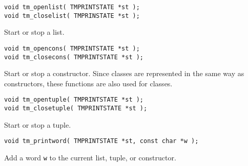 \begin{verbatim}
void tm_openlist( TMPRINTSTATE *st );
void tm_closelist( TMPRINSTATE *st );
\end{verbatim}
\begin{desc}
Start or stop a list.
\end{desc}
\begin{verbatim}
void tm_opencons( TMPRINTSTATE *st );
void tm_closecons( TMPRINTSTATE *st );
\end{verbatim}
\begin{desc}
Start or stop a constructor. Since classes are represented in the
same way as constructors, these functions are also used for classes.
\end{desc}
\begin{verbatim}
void tm_opentuple( TMPRINTSTATE *st );
void tm_closetuple( TMPRINTSTATE *st );
\end{verbatim}
\begin{desc}
Start or stop a tuple.
\end{desc}
\begin{verbatim}
void tm_printword( TMPRINTSTATE *st, const char *w );
\end{verbatim}
\begin{desc}
Add a word {\tt w} to the current list, tuple, or constructor.
\end{desc}
